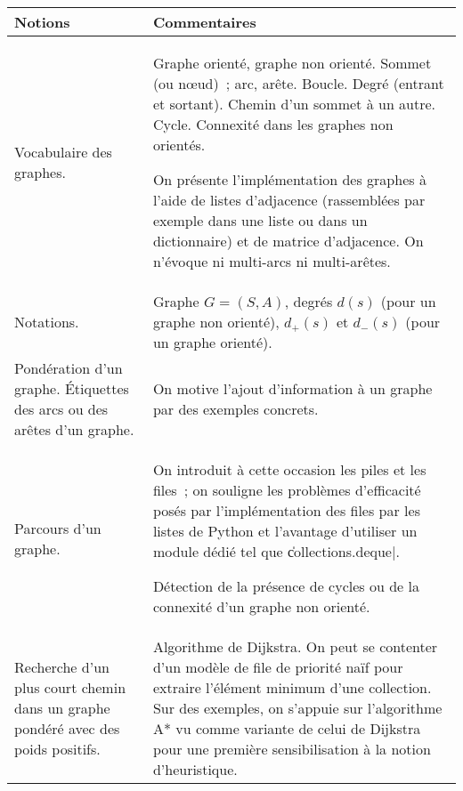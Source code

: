\begin{longtable}{|p{\lnotion}|p{\comment}|}
    \hline
    \textbf{Notions} & \textbf{Commentaires} \\
    \hline \hline
	Vocabulaire des graphes.&
	Graphe orienté, graphe non orienté. Sommet (ou n\oe ud)~; arc, arête. Boucle. Degré (entrant et sortant). Chemin d'un sommet à un autre. Cycle. Connexité dans les graphes non orientés.

	On présente l'implémentation des graphes à l'aide de listes d'adjacence (rassemblées par exemple dans une liste ou dans un dictionnaire) et de matrice d'adjacence.
	 On n'évoque ni multi-arcs ni multi-arêtes.\\ \hline
	Notations.& Graphe $G = (S,A)$, degrés $d(s)$ (pour un graphe non orienté), $d_+(s)$ et $d_-(s)$ (pour un graphe orienté). \\ \hline
 Pondération d'un graphe. \'Etiquettes des arcs ou des arêtes d'un graphe.& On motive l'ajout d'information à un graphe par des exemples concrets.\\ \hline
	Parcours d'un graphe. & On introduit à cette occasion les piles et les files~; on souligne les problèmes d'efficacité posés par l'implémentation des files par les listes de Python et l'avantage d'utiliser un module dédié tel que \|collections.deque|.

  Détection de la présence de cycles ou de la connexité d'un graphe non orienté.\\ \hline
	Recherche d'un plus court chemin dans un graphe pondéré avec des poids positifs.&
	Algorithme de Dijkstra. On peut se contenter d'un modèle de file de priorité naïf pour extraire l'élément minimum d'une collection. Sur des exemples, on s'appuie sur l'algorithme A* vu comme variante de celui de Dijkstra pour une première sensibilisation à la notion d'heuristique.\\ \hline

\end{longtable}
